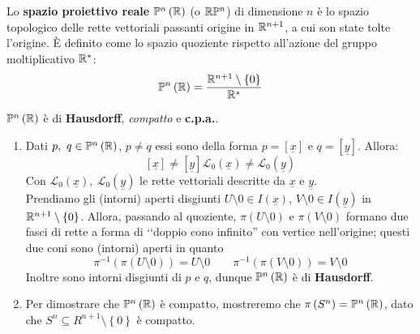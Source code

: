 \begin{define}
	Lo \textbf{spazio proiettivo reale} $\proj[n]{\realset}$ (o $\realset\proj[n]{\ }$) di dimensione $n$ è lo spazio topologico delle rette vettoriali passanti origine in $\mathbb{R}^{n+1}$, a cui son state tolte l'origine. È definito come lo spazio quoziente rispetto all'azione del gruppo moltiplicativo $\mathbb{R}^{\ast}$:
	\begin{equation}
		\proj[n]{\realset}= \frac{\realset^{n+1}\setminus \left\{0\right\}}{\realset^{\ast}}
	\end{equation}
\end{define}
\begin{proposition}
$\proj[n]{\realset}$ è di \textbf{Hausdorff}, \textit{compatto} e \textbf{c.p.a.}.
\end{proposition}
\begin{demonstration}
\begin{enumerate}[label=\Roman*]
\item Dati $p,\ q\in\proj[n]{\realset}$, $p\neq q$ essi sono della forma $p=\left[\underline{x}\right]$ e $q=\left[\underline{y}\right]$. Allora:
\begin{equation*}
\left[\underline{x}\right]\neq\left[\underline{y}\right]\mathcal{L}_0\left(\underline{x}\right)\neq\mathcal{L}_0\left(\underline{y}\right)
\end{equation*}
Con $\mathcal{L}_0\left(\underline{x}\right),\ \mathcal{L}_0\left(\underline{y}\right)$ le rette vettoriali descritte da $\underline{x}$ e $\underline{y}$.\\
Prendiamo gli (intorni) aperti disgiunti $U\setminus{0}\in I\left(\underline{x}\right)$, $V\setminus{0}\in I\left(\underline{y}\right)$ in $\mathbb{R}^{n+1}\setminus\left\{0\right\}$. Allora, passando al quoziente, $\pi\left(U\setminus{0}\right)$ e $\pi\left(V\setminus{0}\right)$ formano due fasci di rette a forma di ‘‘doppio cono infinito'' con vertice nell'origine; questi due coni sono (intorni) aperti in quanto
\begin{equation*}
\pi^{-1}\left(\pi\left(U\setminus{0}\right)\right)=U\setminus{0}\qquad\pi^{-1}\left(\pi\left(V\setminus{0}\right)\right)=V\setminus{0}
\end{equation*}
Inoltre sono intorni disgiunti di $p$ e $q$, dunque $\proj[n]{\realset}$ è di \textbf{Hausdorff}.
\item Per dimostrare che $\proj[n]{\realset}$ è compatto, mostreremo che $\pi\left(S^n\right)=\proj[n]{\realset}$, dato che $S^n\subseteq R^{n+1}\setminus\left\{0\right\}$ è compatto.\\

\end{enumerate}
\end{demonstration}

